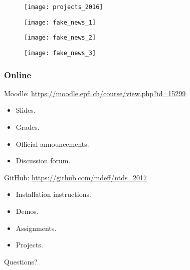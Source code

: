 \documentclass{beamer}
\begin{document}

\begin{frame}
	\begin{figure}
		\texttt{[image: projects\_2016]}
	\end{figure}
\end{frame}


\begin{frame}
	\begin{figure}
		\texttt{[image: fake\_news\_1]}
	\end{figure}
\end{frame}


\begin{frame}
	\begin{figure}
		\texttt{[image: fake\_news\_2]}
	\end{figure}
\end{frame}


\begin{frame}
	\begin{figure}
		\texttt{[image: fake\_news\_3]}
	\end{figure}
\end{frame}


\begin{frame}
	\frametitle{Online}
	Moodle: {\small \url{https://moodle.epfl.ch/course/view.php?id=15299}}
	\begin{itemize}
		\item Slides.
		\item Grades.
		\item Official announcements.
		\item Discussion forum.
	\end{itemize}
	\vspace{1em}
	GitHub: {\small \url{https://github.com/mdeff/ntds_2017}}
	\begin{itemize}
		\item Installation instructions.
		\item Demos.
		\item Assignments.
		\item Projects.
	\end{itemize}
	\vfill
	\begin{center}
		\Huge Questions?
	\end{center}
\end{frame}

\end{document}

